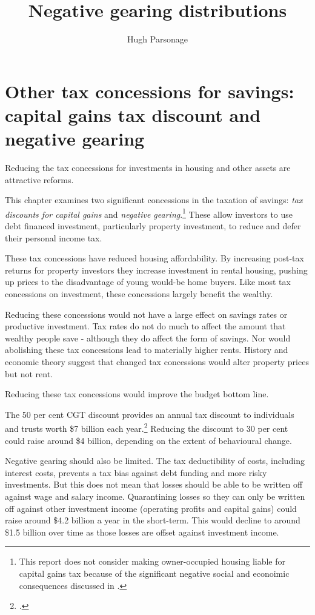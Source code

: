 \documentclass{grattan}\usepackage[]{graphicx}\usepackage[]{color}
\title{Negative gearing distributions}
\author{Hugh Parsonage}
\newcommand{\highlight}[1]{\emph{#1}}
\begin{document}
\clearpage

\chapter{Other tax concessions for savings: capital gains tax discount and negative gearing}
Reducing the tax concessions for investments in housing and other assets are attractive reforms. 

This chapter examines two significant concessions in the taxation of savings: \highlight{tax discounts for capital gains} and \highlight{negative gearing}.\footnote{This report does not consider making owner-occupied housing liable for capital gains tax because of the significant negative social and econoimic consequences discussed in \textcite{Daley2013}.}  These allow investors to use debt financed investment, particularly property investment, to reduce and defer their personal income tax.

These tax concessions have reduced housing affordability. By increasing post-tax returns for property investors they increase investment in rental housing, pushing up prices to the disadvantage of young would-be home buyers. Like most tax concessions on investment, these concessions largely benefit the wealthy. 

Reducing these concessions would not have a large effect on savings rates or productive investment. Tax rates do not do much to affect the amount that wealthy people save - although they do affect the form of savings. Nor would abolishing these tax concessions lead to materially higher rents. History and economic theory suggest that changed tax concessions would alter property prices but not rent. 

Reducing these tax concessions would improve the budget bottom line. 

The 50 per cent CGT discount provides an annual tax discount to individuals and trusts worth \$7 billion each year.\footcite[p.~74]{Treasury2015a}  Reducing the discount to 30 per cent could raise around \$4 billion, depending on the extent of behavioural change. 

Negative gearing should also be limited. The tax deductibility of costs, including interest costs, prevents a tax bias against debt funding and more risky investments. But this does not mean that losses should be able to be written off against wage and salary income. Quarantining losses so they can only be written off against other investment income (operating profits and capital gains) could raise around \$4.2 billion a year in the short-term. This would decline to around \$1.5 billion over time as those losses are offset against investment income.  
\end{document}
